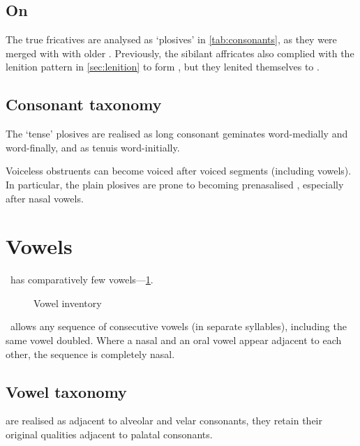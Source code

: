 \subsection{On }
The true fricatives  are analysed as `plosives' in \cref{tab:consonants},
as they were merged with with older . Previously, the sibilant affricates also complied with
the lenition pattern in \cref{sec:lenition} to form , but they lenited themselves to .

\subsection{Consonant taxonomy}
The `tense' plosives  are realised as long consonant
geminates word-medially and word-finally, and as tenuis  word-initially.

Voiceless obstruents can become voiced after voiced segments (including vowels). In particular,
the plain plosives  are prone to becoming prenasalised ,
especially after nasal vowels.

\section{Vowels}
\label{sec:vowels}

\langname~has comparatively few vowels---\cref{fig:vowels}.

\begin{figure}
	\centering
	\begin{vowel}
	\end{vowel}
	\caption{Vowel inventory}
	\label{fig:vowels}
\end{figure}

\langname~allows any sequence of consecutive vowels (in separate syllables), including
the same vowel doubled. Where a nasal and an oral vowel appear adjacent to each other,
the sequence is completely nasal.

\subsection{Vowel taxonomy}
 are realised as  adjacent to alveolar and velar consonants,
they retain their original qualities adjacent to palatal consonants.

